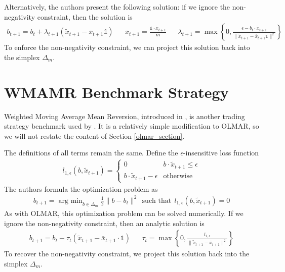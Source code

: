 Alternatively, the authors present the following solution: if we ignore the non-negativity constraint, then the solution is
\begin{align*}
  b_{t+1} = b_t + \lambda_{t+1}(\tilde x_{t+1} - \bar x_{t+1} \mathbb{1}) && \bar x_{t+1} = \frac{\mathbb{1} \cdot \tilde x_{t+1}}{m} && \lambda_{t+1} = \max\left\{0, \frac{\epsilon - b_t \cdot \tilde x_{t+1}}{\|\tilde x_{t+1} - \bar x_{t+1} \mathbb{1}\|^2}\right\}
\end{align*}
To enforce the non-negativity constraint, we can project this solution back into the simplex $\Delta_m$.


\section{WMAMR Benchmark Strategy}
Weighted Moving Average Mean Reversion, introduced in \cite{wmamr_paper}, is another trading strategy benchmark used by \cite{rl_augmented_states}.
It is a relatively simple modification to OLMAR, so we will not restate the content of Section \ref{olmar_section}.

The definitions of all terms remain the same. Define the $\epsilon$-insensitive loss function
\begin{align*}
  l_{1,\epsilon}(b, \tilde x_{t+1}) = \begin{cases}
    0 & b \cdot \tilde x_{t+1} \leq \epsilon \\
    b \cdot \tilde x_{t+1} - \epsilon & \text{otherwise}
  \end{cases}
\end{align*}
The authors formula the optimization problem as
\begin{align*}
  b_{t+1} = \mathop{\mathrm{arg\:min}}_{b \in \Delta_m} \frac{1}{2}\|b - b_t\|^2 \:\:\text{such that}\:\: l_{1,\epsilon}(b, \tilde x_{t+1}) = 0
\end{align*}
As with OLMAR, this optimization problem can be solved numerically.
If we ignore the non-negativity constraint, then an analytic solution is
\begin{align*}
  b_{t+1} = b_t - \tau_t(\tilde x_{t+1} - \bar x_{t+1} \cdot \mathbb{1}) && \tau_t = \max\left\{0, \frac{l_{1,\epsilon}}{\|\tilde x_{t+1} - \bar x_{t+1}\|^2}\right\}
\end{align*}
To recover the non-negativity constraint, we project this solution back into the simplex $\Delta_m$.


